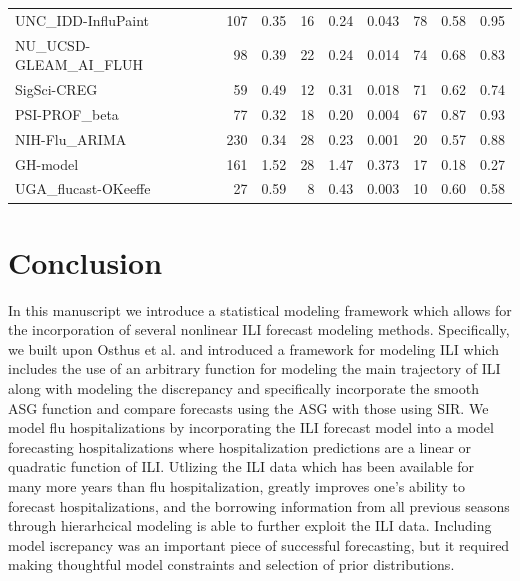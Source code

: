 \begin{table}[ht]
\begin{adjustwidth}{-3cm}{-1.5cm}
\begin{tabular}{lrrrrrrrr}
  UNC\_IDD-InfluPaint & 107 & 0.35 & 16 & 0.24 & 0.043 & 78 & 0.58 & 0.95 \\ 
  NU\_UCSD-GLEAM\_AI\_FLUH & 98 & 0.39 & 22 & 0.24 & 0.014 & 74 & 0.68 & 0.83 \\ 
  SigSci-CREG & 59 & 0.49 & 12 & 0.31 & 0.018 & 71 & 0.62 & 0.74 \\ 
  PSI-PROF\_beta & 77 & 0.32 & 18 & 0.20 & 0.004 & 67 & 0.87 & 0.93 \\ 
  NIH-Flu\_ARIMA & 230 & 0.34 & 28 & 0.23 & 0.001 & 20 & 0.57 & 0.88 \\ 
  GH-model & 161 & 1.52 & 28 & 1.47 & 0.373 & 17 & 0.18 & 0.27 \\ 
  UGA\_flucast-OKeeffe & 27 & 0.59 & 8 & 0.43 & 0.003 & 10 & 0.60 & 0.58 \\  
\end{tabular}
\end{adjustwidth}
\label{tab:fin_analysis_stats}
\end{table}










\section{Conclusion}
\label{sec:conclusion}

 In this manuscript we introduce a statistical modeling framework which allows 
 for the incorporation of several nonlinear
 ILI forecast modeling methods. Specifically, 
 we built upon Osthus et al. \cite[]{osthus2019dynamic} and introduced a 
 framework for modeling ILI which includes the use of an arbitrary function 
 for modeling the main trajectory of ILI along with modeling the discrepancy and
 specifically incorporate the smooth ASG function and compare forecasts using 
 the ASG with those using SIR. 
 We model flu hospitalizations by incorporating the ILI forecast model into a 
 model forecasting hospitalizations where hospitalization predictions are a 
 linear or quadratic function of ILI. Utlizing the ILI data which has been
 available for many more years than flu hospitalization, greatly improves
 one's ability to forecast hospitalizations, and the borrowing information 
 from all previous seasons through hierarhcical modeling is able to further
 exploit the ILI data. Including model iscrepancy was an important piece of 
 successful forecasting, but it required making thoughtful model constraints
 and selection of prior distributions.

